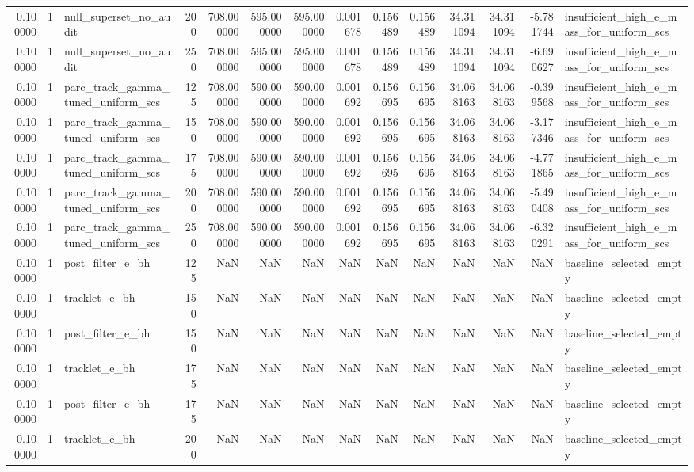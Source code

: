 \begin{tabular}{rrlrrrrrrrrrrl}
0.100000 & 1 & null_superset_no_audit & 200 & 708.000000 & 595.000000 & 595.000000 & 0.001678 & 0.156489 & 0.156489 & 34.311094 & 34.311094 & -5.781744 & insufficient_high_e_mass_for_uniform_scs \\
0.100000 & 1 & null_superset_no_audit & 250 & 708.000000 & 595.000000 & 595.000000 & 0.001678 & 0.156489 & 0.156489 & 34.311094 & 34.311094 & -6.690627 & insufficient_high_e_mass_for_uniform_scs \\
0.100000 & 1 & parc_track_gamma_tuned_uniform_scs & 125 & 708.000000 & 590.000000 & 590.000000 & 0.001692 & 0.156695 & 0.156695 & 34.068163 & 34.068163 & -0.399568 & insufficient_high_e_mass_for_uniform_scs \\
0.100000 & 1 & parc_track_gamma_tuned_uniform_scs & 150 & 708.000000 & 590.000000 & 590.000000 & 0.001692 & 0.156695 & 0.156695 & 34.068163 & 34.068163 & -3.177346 & insufficient_high_e_mass_for_uniform_scs \\
0.100000 & 1 & parc_track_gamma_tuned_uniform_scs & 175 & 708.000000 & 590.000000 & 590.000000 & 0.001692 & 0.156695 & 0.156695 & 34.068163 & 34.068163 & -4.771865 & insufficient_high_e_mass_for_uniform_scs \\
0.100000 & 1 & parc_track_gamma_tuned_uniform_scs & 200 & 708.000000 & 590.000000 & 590.000000 & 0.001692 & 0.156695 & 0.156695 & 34.068163 & 34.068163 & -5.490408 & insufficient_high_e_mass_for_uniform_scs \\
0.100000 & 1 & parc_track_gamma_tuned_uniform_scs & 250 & 708.000000 & 590.000000 & 590.000000 & 0.001692 & 0.156695 & 0.156695 & 34.068163 & 34.068163 & -6.320291 & insufficient_high_e_mass_for_uniform_scs \\
0.100000 & 1 & post_filter_e_bh & 125 & NaN & NaN & NaN & NaN & NaN & NaN & NaN & NaN & NaN & baseline_selected_empty \\
0.100000 & 1 & tracklet_e_bh & 150 & NaN & NaN & NaN & NaN & NaN & NaN & NaN & NaN & NaN & baseline_selected_empty \\
0.100000 & 1 & post_filter_e_bh & 150 & NaN & NaN & NaN & NaN & NaN & NaN & NaN & NaN & NaN & baseline_selected_empty \\
0.100000 & 1 & tracklet_e_bh & 175 & NaN & NaN & NaN & NaN & NaN & NaN & NaN & NaN & NaN & baseline_selected_empty \\
0.100000 & 1 & post_filter_e_bh & 175 & NaN & NaN & NaN & NaN & NaN & NaN & NaN & NaN & NaN & baseline_selected_empty \\
0.100000 & 1 & tracklet_e_bh & 200 & NaN & NaN & NaN & NaN & NaN & NaN & NaN & NaN & NaN & baseline_selected_empty \\

\end{tabular}
